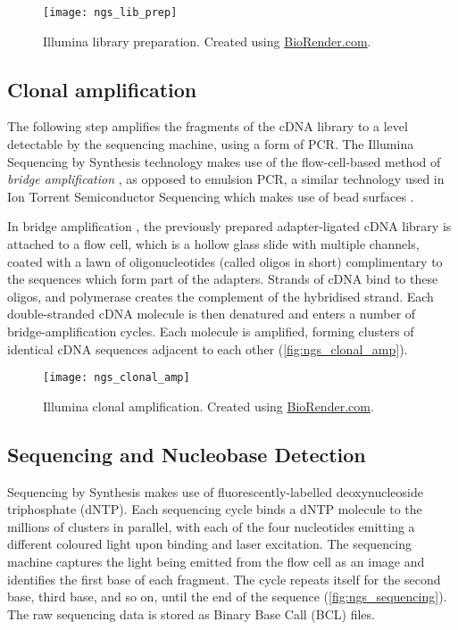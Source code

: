 
\begin{figure}[!h]
    \centering
    \texttt{[image: ngs\_lib\_prep]}
    \caption[Library preparation]{Illumina library preparation. Created using \href{https://biorender.com/}{BioRender.com}. } 
    \label{fig:ngs_lib_prep}
\end{figure}

\subsection{Clonal amplification}
The following step amplifies the fragments of the cDNA library to a level detectable by the sequencing machine, using a form of \ac{PCR}. The Illumina Sequencing by Synthesis technology makes use of the flow-cell-based method of \textit{bridge amplification} \citep{illumina2010}, as opposed to emulsion PCR, a similar technology used in Ion Torrent Semiconductor Sequencing which makes use of bead surfaces \citep{williams2006amplification}.

In bridge amplification \citep{illumina2010}, the previously prepared adapter-ligated cDNA library is attached to a flow cell, which is a hollow glass slide with multiple channels, coated with a lawn of oligonucleotides (called oligos in short) complimentary to the sequences which form part of the adapters. Strands of cDNA bind to these oligos, and polymerase creates the complement of the hybridised strand. Each double-stranded cDNA molecule is then denatured and enters a number of bridge-amplification cycles. Each molecule is amplified, forming clusters of identical cDNA sequences adjacent to each other (\autoref{fig:ngs_clonal_amp}).

\begin{figure}[!h]
    \centering
    \texttt{[image: ngs\_clonal\_amp]}
    \caption[Illumina clonal amplification]{Illumina clonal amplification. Created using \href{https://biorender.com/}{BioRender.com}. } 
    \label{fig:ngs_clonal_amp}
\end{figure}

\subsection{Sequencing and Nucleobase Detection}
Sequencing by Synthesis \citep{illumina2010} makes use of fluorescently-labelled deoxynucleoside triphosphate (dNTP). Each sequencing cycle binds a dNTP molecule to the millions of clusters in parallel, with each of the four nucleotides emitting a different coloured light upon binding and laser excitation. The sequencing machine captures the light being emitted from the flow cell as an image and identifies the first base of each fragment. The cycle repeats itself for the second base, third base, and so on, until the end of the sequence (\autoref{fig:ngs_sequencing}). The raw sequencing data is stored as Binary Base Call (BCL) files.

